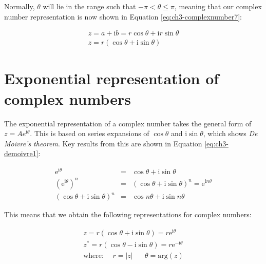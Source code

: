 \documentclass[
]{book}
\begin{document}
Normally, \(\theta\) will lie in the range such that \(-\pi < \theta \leq \pi\), meaning that our complex number representation is now shown in Equation \eqref{eq:ch3-complexnumber7}:

\begin{equation}
\begin{array}{c}
z = a + \mathrm{i}b = r \cos \theta + \mathrm{i} r \sin \theta \\
z = r \left( \cos \theta + \mathrm{i} \sin \theta \right)
\end{array}
\label{eq:ch3-complexnumber7}
\end{equation}

\hypertarget{sec-ch3-exponentialrepresentationcomplex}{%
\section{Exponential representation of complex numbers}\label{sec-ch3-exponentialrepresentationcomplex}}

The exponential representation of a complex number takes the general form of \(z = Ae^{\mathrm{i}\theta}\). This is based on series expansions of \(\cos \theta\) and \(\mathrm{i}\sin \theta\), which shows \emph{De Moivre's theorem}. Key results from this are shown in Equation \eqref{eq:ch3-demoivre1}:

\begin{equation}
\begin{array}{rcl}
\mathrm{e}^{\mathrm{i}\theta} &= &\cos \theta + \mathrm{i}\sin \theta\\
\left( \mathrm{e}^{\mathrm{i}\theta} \right)^n &=& \left( \cos \theta + \mathrm{i}\sin \theta \right)^n = \mathrm{e}^{\mathrm{i}n\theta} \\
\left( \cos \theta + \mathrm{i}\sin \theta \right)^n &=&  \cos n\theta + \mathrm{i}\sin n \theta
\end{array}
\label{eq:ch3-demoivre1}
\end{equation}

This means that we obtain the following representations for complex numbers:

\begin{equation}
\begin{array}{c}
z = r \left( \cos \theta + \mathrm{i}\sin \theta \right) = r\mathrm{e}^{\mathrm{i}\theta}\\
z^* = r \left( \cos \theta - \mathrm{i}\sin \theta \right) = r\mathrm{e}^{-\mathrm{i}\theta}\\
\textrm{where:} \hspace{15pt} r = |z| \hspace{20pt} \theta = \textrm{arg}(z)
\end{array}
\end{equation}
\end{document}

